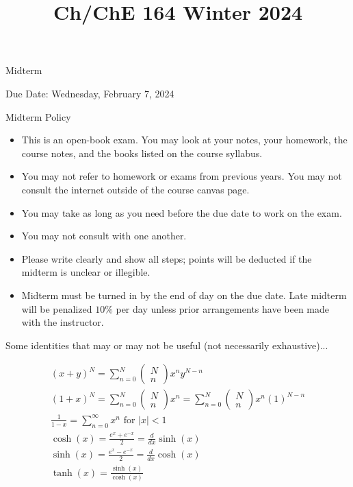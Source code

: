 \documentclass[12pt]{article}
\title{Ch/ChE 164 Winter 2024 }
\author{}
\date{}
\begin{document}
\maketitle
Midterm

Due Date: Wednesday, February 7, 2024

Midterm Policy

\begin{itemize}
  \item This is an open-book exam. You may look at your notes, your homework, the course notes, and the books listed on the course syllabus.
  \item You may not refer to homework or exams from previous years. You may not consult the internet outside of the course canvas page.
  \item You may take as long as you need before the due date to work on the exam.
  \item You may not consult with one another.
  \item Please write clearly and show all steps; points will be deducted if the midterm is unclear or illegible.
  \item Midterm must be turned in by the end of day on the due date. Late midterm will be penalized $10 \%$ per day unless prior arrangements have been made with the instructor.
\end{itemize}

Some identities that may or may not be useful (not necessarily exhaustive)...

$$
\begin{gathered}
(x+y)^{N}=\sum_{n=0}^{N}\left(\begin{array}{l}
N \\
n
\end{array}\right) x^{n} y^{N-n} \\
(1+x)^{N}=\sum_{n=0}^{N}\left(\begin{array}{l}
N \\
n
\end{array}\right) x^{n}=\sum_{n=0}^{N}\left(\begin{array}{l}
N \\
n
\end{array}\right) x^{n}(1)^{N-n} \\
\frac{1}{1-x}=\sum_{n=0}^{\infty} x^{n} \text { for }|x|<1 \\
\cosh (x)=\frac{e^{x}+e^{-x}}{2}=\frac{d}{d x} \sinh (x) \\
\sinh (x)=\frac{e^{x}-e^{-x}}{2}=\frac{d}{d x} \cosh (x) \\
\tanh (x)=\frac{\sinh (x)}{\cosh (x)}
\end{gathered}
$$
\end{document}

